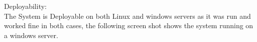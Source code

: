 \item {Deployability:}\\

The System is Deployable on both Linux and windows servers as it was run and worked fine in both cases, the following screen shot shows the system running on a windows server.